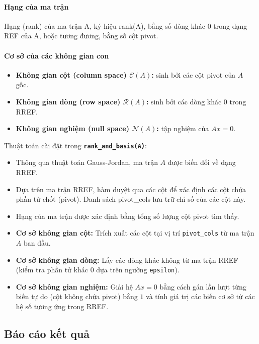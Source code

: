 \documentclass[12pt,a4paper]{article}
\begin{document}
\paragraph{Hạng của ma trận}
Hạng (rank) của ma trận A, ký hiệu rank(A), bằng số dòng
khác 0 trong dạng REF của A, hoặc tương đương, bằng số cột pivot.

\paragraph{Cơ sở của các không gian con}
\begin{itemize}
    \item \textbf{Không gian cột (column space) $\mathcal{C}(A)$:} sinh bởi các cột pivot của $A$ gốc.
    \item \textbf{Không gian dòng (row space) $\mathcal{R}(A)$:} sinh bởi các dòng khác $0$ trong RREF.
    \item \textbf{Không gian nghiệm (null space) $\mathcal{N}(A)$:} tập nghiệm của $Ax = 0$.
\end{itemize}

Thuật toán cài đặt trong \texttt{\textbf{rank\_and\_basis(A)}}:
\begin{itemize}
    \item Thông qua thuật toán Gauss-Jordan, ma trận $A$ được biến đổi về dạng RREF.
    
    \item Dựa trên ma trận RREF, hàm duyệt qua các cột để xác định các cột chứa phần tử chốt (pivot). Danh sách pivot\_cols lưu trữ chỉ số của các cột này.
    
    \item Hạng của ma trận được xác định bằng tổng số lượng cột pivot tìm thấy.

    \item \textbf{Cơ sở không gian cột:} Trích xuất các cột tại vị trí \texttt{pivot\_cols} từ ma trận $A$ ban đầu.

    \item \textbf{Cơ sở không gian dòng:} Lấy các dòng khác không từ ma trận RREF (kiểm tra phần tử khác $0$ dựa trên ngưỡng \texttt{epsilon}).

    \item \textbf{Cơ sở không gian nghiệm:} Giải hệ $Ax=0$ bằng cách gán lần lượt từng biến tự do (cột không chứa pivot) bằng $1$ và tính giá trị các biến cơ sở từ các hệ số tương ứng trong RREF.
\end{itemize}

\subsection{Báo cáo kết quả}
\end{document}
